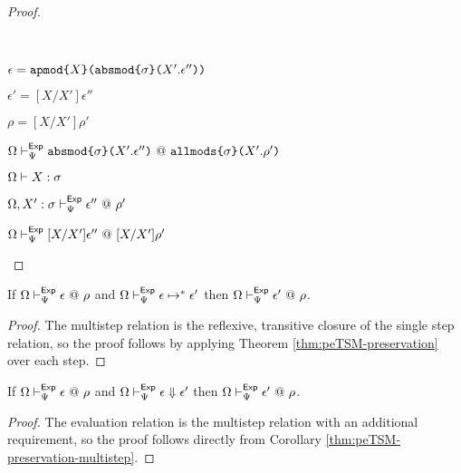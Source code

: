 \begin{proof}
\begin{byCases}
  \begin{byCases}
    \item[\text{(\ref{rule:hastsmtypeExp-apmod})}] ~
      \begin{pfsteps*}
        \item $\epsilon=\texttt{apmod}\texttt{\{}X\texttt{\}(}\texttt{absmod}\texttt{\{}\sigma\texttt{\}(}X'.\epsilon''\texttt{)}\texttt{)}$ 
        \item $\epsilon'=[X/X']\epsilon''$ 
        \item $\rho=[X/X']\rho'$ 
        \item $\Omega \vdash_{\Psi}^{\mathsf{Exp}} \texttt{absmod}\texttt{\{}\sigma\texttt{\}(}X'.\epsilon''\texttt{)} ~@~ \texttt{allmods}\texttt{\{}\sigma\texttt{\}(}X'.\rho'\texttt{)}$  
        \item $\Omega \vdash X : \sigma$  
        \item $\Omega, X' : \sigma \vdash_{\Psi}^{\mathsf{Exp}} \epsilon'' ~@~ \rho'$  
        \item $\Omega \vdash_{\Psi}^{\mathsf{Exp}} [X/X']\epsilon'' ~@~ [X/X']\rho'$ 
      \end{pfsteps*}
      \resetpfcounter
  \end{byCases}
\end{byCases}
\end{proof}

\begin{corollary}
\label{thm:peTSM-preservation-multistep}
If $\Omega \vdash_{\Psi}^{\mathsf{Exp}} \epsilon ~@~ \rho$ and $\Omega \vdash_{\Psi}^\mathsf{Exp} \epsilon \mapsto^{*} \epsilon'$ then $\Omega \vdash_{\Psi}^{\mathsf{Exp}} \epsilon' ~@~ \rho$.
\end{corollary}
\begin{proof} The multistep relation is the reflexive, transitive closure of the single step relation, so the proof follows by applying Theorem \ref{thm:peTSM-preservation} over each step. \end{proof}

\begin{corollary}
\label{thm:peTSM-preservation-evaluation}
If $\Omega \vdash_{\Psi}^{\mathsf{Exp}} \epsilon ~@~ \rho$ and $\Omega \vdash_{\Psi}^\mathsf{Exp} \epsilon \Downarrow \epsilon'$ then $\Omega \vdash_{\Psi}^{\mathsf{Exp}} \epsilon' ~@~ \rho$.
\end{corollary}
\begin{proof} The evaluation relation is the multistep relation with an additional requirement, so the proof follows directly from Corollary \ref{thm:peTSM-preservation-multistep}. \end{proof}

